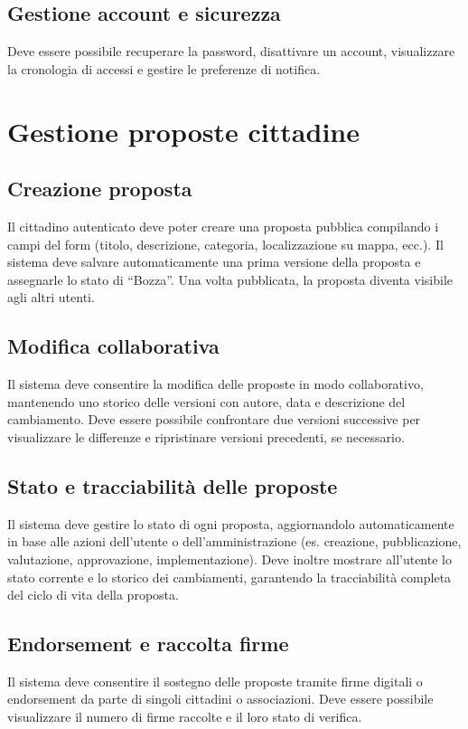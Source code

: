 \subsection{Gestione account e sicurezza}
Deve essere possibile recuperare la password, disattivare un account, visualizzare la cronologia di accessi e gestire le preferenze di notifica.

\section{Gestione proposte cittadine}

\subsection{Creazione proposta}
Il cittadino autenticato deve poter creare una proposta pubblica compilando i campi del form (titolo, descrizione, categoria, localizzazione su mappa, ecc.).  
Il sistema deve salvare automaticamente una prima versione della proposta e assegnarle lo stato di “Bozza”.  
Una volta pubblicata, la proposta diventa visibile agli altri utenti.

\subsection{Modifica collaborativa}
Il sistema deve consentire la modifica delle proposte in modo collaborativo, mantenendo uno storico delle versioni con autore, data e descrizione del cambiamento.  
Deve essere possibile confrontare due versioni successive per visualizzare le differenze e ripristinare versioni precedenti, se necessario.

\subsection{Stato e tracciabilità delle proposte}
Il sistema deve gestire lo stato di ogni proposta, aggiornandolo automaticamente in base alle azioni dell’utente o dell’amministrazione (es. creazione, pubblicazione, valutazione, approvazione, implementazione).
Deve inoltre mostrare all’utente lo stato corrente e lo storico dei cambiamenti, garantendo la tracciabilità completa del ciclo di vita della proposta.

\subsection{Endorsement e raccolta firme}
Il sistema deve consentire il sostegno delle proposte tramite firme digitali o endorsement da parte di singoli cittadini o associazioni.  
Deve essere possibile visualizzare il numero di firme raccolte e il loro stato di verifica.

